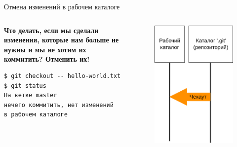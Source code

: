 \documentclass[presentation]{beamer}
\begin{document}
\begin{frame}[fragile]{Отмена изменений в рабочем каталоге}
\begin{columns}
\begin{column}{0.6\textwidth}
  \textbf{Что делать, если мы сделали изменения, которые нам больше не
    нужны и мы не хотим их коммитить?  Отменить их!}
\begin{verbatim}
$ git checkout -- hello-world.txt
$ git status
На ветке master
нечего коммитить, нет изменений
в рабочем каталоге
\end{verbatim}
    \end{column}
    \begin{column}{0.4\textwidth}
      \begin{figure}[htb]
        \includegraphics[width=1\textwidth]{git-operation-checkout-file}
      \end{figure}
    \end{column}
  \end{columns}
\end{frame}
\end{document}
